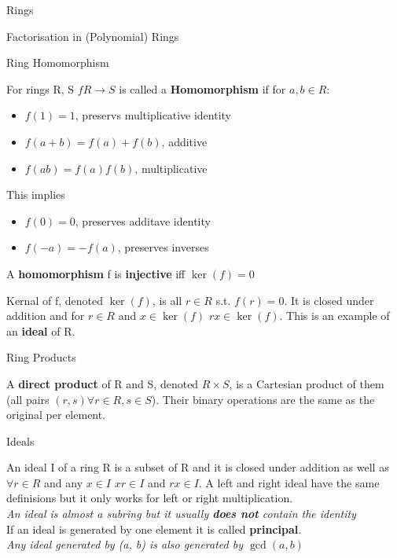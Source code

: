 \documentclass[12pt, letterpaper]{article}
\begin{document}
\begin{section}{Rings}
\begin{subsection}{Factorisation in (Polynomial) Rings}
  \end{subsection}

  \begin{subsection}{Ring Homomorphism}

    For rings R, S \(f R \to S\) is called a \textbf{Homomorphism} if for
    \(a, b \in R\):
    \begin{itemize}
      \item \(f(1) = 1\), preservs multiplicative identity
      \item \(f(a + b) = f(a) + f(b)\), additive
      \item \(f(ab) = f(a)f(b)\), multiplicative
    \end{itemize}

    This implies
    \begin{itemize}
      \item \(f(0) = 0\), preserves additave identity
      \item \(f(-a) = -f(a)\), preserves inverses
    \end{itemize}

    A \textbf{homomorphism} f is \textbf{injective} iff \(\ker(f) = 0\)

    Kernal of f, denoted \(\ker(f)\), is all \(r \in R\) s.t. \(f(r) = 0\). It is
    closed under addition and for \(r \in R\) and \(x \in \ker(f)\) \(rx \in \ker(f)\).
    This is an example of an \textbf{ideal} of R.

  \end{subsection}

  \begin{subsection}{Ring Products}

    A \textbf{direct product} of R and S, denoted \(R \times S\), is a Cartesian
    product of them (all pairs \((r, s) \forall r \in R, s \in S\)). Their
    binary operations are the same as the original per element.

  \end{subsection}

  \begin{subsection}{Ideals}

    An ideal I of a ring R is a subset of R and it is closed under addition as
    well as \(\forall r \in R\) and any \(x \in I\) \(xr \in I\) and \(rx \in I\).
    A left and right ideal have the same definisions but it only works for left
    or right multiplication. \\
    \emph{An ideal is almost a subring but it usually \textbf{does not} contain
      the identity} \\
    If an ideal is generated by one element it is called \textbf{principal}. \\
    \emph{Any ideal generated by (a, b) is also generated by \(\gcd(a, b)\)}


\end{subsection}
\end{section}
\end{document}
